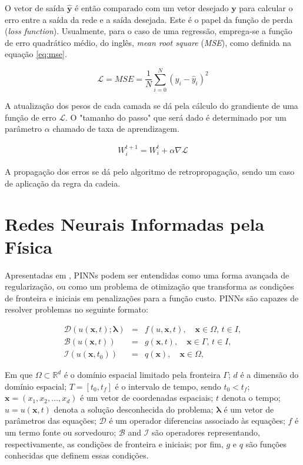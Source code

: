 O vetor de saída $\boldsymbol{\hat{y}}$ é então comparado com um vetor desejado 
$\boldsymbol{y}$ para calcular o erro entre a saída da rede e a saída desejada.
Este é o papel da função de perda (\textit{loss function}). 
Usualmente, para o caso de uma regressão, emprega-se a função de erro quadrático médio, 
do inglês, \textit{mean root square} (\textit{MSE}), como definida na equação
\ref{eq:mse}.

\begin{equation}\label{eq:mse}
    \mathcal{L} = MSE = \frac{1}{N} \sum_{i=0}^{N}(y_i - \hat{y}_i)^{2}
\end{equation}

A atualização dos pesos de cada camada se dá pela cálculo do grandiente
de uma função de erro $\mathcal{L}$. O "tamanho do passo" que será dado
é determinado por um parâmetro $\alpha$ chamado de taxa de aprendizagem.

\begin{eqnarray}\label{eq:atualizacao-parametros-redes}
    W_i^{t + 1} = W_i^{t} + \alpha \nabla \mathcal{L}
\end{eqnarray}

A propagação dos erros se dá pelo algoritmo de retropropagação, sendo um caso 
de aplicação da regra da cadeia. 


\section{Redes Neurais Informadas pela Física}

Apresentadas em \cite{raissi-etal:19}, PINNs podem ser entendidas como uma forma
avançada de regularização, ou como um problema de otimização que transforma 
as condições de fronteira e iniciais em penalizações para a função custo. PINNs
são capazes de resolver problemas no seguinte formato: 

\begin{eqnarray}
    \mathcal{D}(u(\boldsymbol{x},t);\boldsymbol{\lambda}) &=& f(u,\boldsymbol{x},t), \quad \boldsymbol{x} \in \Omega, \, t \in I, \label{model-1-a}\\
    \mathcal{B}(u(\boldsymbol{x},t)) &=& g(\boldsymbol{x},t), \quad \boldsymbol{x} \in \Gamma, \, t \in I, \label{model-1-b}\\
    \mathcal{I}(u(\boldsymbol{x},t_0)) &=& q(\boldsymbol{x}), \quad \boldsymbol{x} \in \Omega, \label{model-1-c}
\end{eqnarray}

Em que $\Omega \subset \mathbb{R}^d$ é o domínio espacial limitado pela 
fronteira $\Gamma$; 
$d$ é a dimensão do domínio espacial; 
$T = [t_0, t_f]$ é o intervalo de tempo, sendo $t_0 < t_f$; 
$\boldsymbol{x} = (x_1, x_2, \dots, x_d)$ é um vetor de coordenadas espaciais; 
$t$ denota o tempo; 
$u = u(\boldsymbol{x}, t)$ denota a solução desconhecida do problema; 
$\boldsymbol{\lambda}$ é um vetor de parâmetros das equações; 
$\mathcal{D}$ é um operador diferencias associado às equações; 
$f$ é um termo fonte ou sorvedouro; 
$\mathcal{B}$ and $\mathcal{I}$ são operadores representando, respectivamente,
as condições de fronteira e iniciais; 
por fim, $g$ e $q$ são funções conhecidas que definem essas condições.

